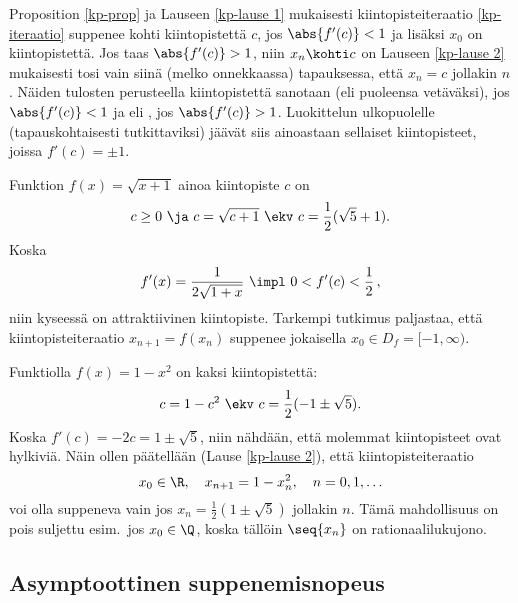 Proposition \ref{kp-prop} ja Lauseen \ref{kp-lause 1} mukaisesti kiintopisteiteraatio 
\eqref{kp-iteraatio} suppenee kohti kiintopistettä $c$, jos $\abs{f'(c)}<1$ ja lisäksi $x_0$ on
  kiintopistettä. Jos taas $\abs{f'(c)}>1$, niin $x_n \kohti c$ on
Lauseen \ref{kp-lause 2} mukaisesti tosi vain siinä (melko onnekkaassa) tapauksessa, että 
%
$x_n=c$ jollakin $n$. Näiden tulosten perusteella kiintopistettä sanotaan 
(eli puoleensa vetäväksi), jos $\abs{f'(c)}<1$ ja  eli ,
jos $\abs{f'(c)}>1$. Luokittelun ulkopuolelle (tapauskohtaisesti tutkittaviksi) jäävät siis 
ainoastaan sellaiset kiintopisteet, joissa $f'(c)=\pm 1$.
\begin{Exa}
Funktion $f(x)=\sqrt{x+1}$ ainoa kiintopiste $c$ on
\[
c\geq 0 \ \ja \ c=\sqrt{c+1} \ \ekv \ c=\frac{1}{2}(\sqrt{5}+1).
\]
Koska
\[
f'(x) = \frac{1}{2\sqrt{1+x}}\ \impl\ 0 < f'(c) < \frac{1}{2}\,,
\]
niin kyseessä on attraktiivinen kiintopiste. Tarkempi tutkimus paljastaa, että 
kiintopisteiteraatio $x_{n+1}=f(x_n)$ suppenee jokaisella $x_0 \in D_f = [-1,\infty)$. 
\loppu \end{Exa}
\begin{Exa} Funktiolla $f(x)=1-x^2$ on kaksi kiintopistettä:
\[
c=1-c^2 \ \ekv \ c=\frac{1}{2}(-1\pm\sqrt{5}).
\]
Koska $f'(c)=-2c=1\pm\sqrt{5}$, niin nähdään, että molemmat kiintopisteet ovat hylkiviä. Näin
ollen päätellään (Lause \ref{kp-lause 2}), että kiintopisteiteraatio
\[
x_0 \in \R, \quad x_{n+1} = 1-x_n^2, \quad n=0,1,\ldots
\]
voi olla suppeneva vain jos $x_n=\frac{1}{2}(1\pm\sqrt{5})$ jollakin $n$. Tämä mahdollisuus on
pois suljettu esim.\ jos $x_0\in\Q$, koska tällöin $\seq{x_n}$ on rationaalilukujono. \loppu
\end{Exa}

\subsection{Asymptoottinen suppenemisnopeus}

